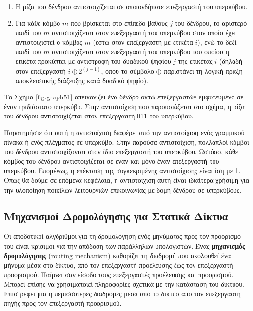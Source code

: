 \documentclass[12pt,a4paper]{article} %
\begin{document}
\begin{enumerate}
\item Η ρίζα του δένδρου αντιστοιχίζεται σε οποιονδήποτε επεξεργαστή
του υπερκύβου.

\item Για κάθε κόμβο $m$ που βρίσκεται στο επίπεδο βάθους $j$ του δένδρου, 
το αριστερό παιδί του $m$ αντιστοιχίζεται στον επεξεργαστή του υπερκύβου 
στον οποίο έχει αντιστοιχιστεί ο κόμβος $m$ (έστω στον επεξεργαστή με 
ετικέτα $i$), ενώ το δεξί παιδί του $m$ αντιστοιχίζεται στον επεξεργαστή 
του υπερκύβου του οποίου η ετικέτα προκύπτει με αντιστροφή του δυαδικού 
ψηφίου $j$ της ετικέτας $i$ (δηλαδή στον επεξεργαστή $i \oplus 2^{(j-1)}$,
όπου το σύμβολο $\oplus$ παριστάνει τη λογική πράξη
αποκλειστικής διάζευξης κατά δυαδικό ψηφίο).
\end{enumerate}

\noindent Το Σχήμα \ref{fig:graph51} απεικονίζει ένα δένδρο οκτώ 
επεξεργαστών εμφυτευμένο σε έναν τριδιάστατο υπερκύβο. Στην 
αντιστοίχιση που παρουσιάζεται στο σχήμα, η ρίζα του δένδρου
αντιστοιχίζεται στον επεξεργαστή 011 του υπερκύβου.

Παρατηρήστε ότι αυτή η αντιστοίχιση διαφέρει από την αντιστοίχιση
ενός γραμμικού πίνακα ή ενός πλέγματος σε υπερκύβο. Στην παρούσα 
αντιστοίχιση, πολλαπλοί κόμβοι του δένδρου αντιστοιχίζονται στον ίδιο 
επεξεργαστή του υπερκύβου. Ωστόσο, κάθε κόμβος του δένδρου αντιστοιχίζεται 
σε έναν και μόνο έναν επεξεργαστή του υπερκύβου. Επομένως, η επέκταση 
της συγκεκριμένης αντιστοίχισης είναι ίση με 1. Όπως θα δούμε σε επόμενα 
κεφάλαια, η αντιστοίχιση αυτή είναι ιδιαίτερα χρήσιμη για την υλοποίηση 
ποικίλων λειτουργιών επικοινωνίας με δομή δένδρου σε υπερκύβους.

\subsection{Μηχανισμοί Δρομολόγησης για Στατικά Δίκτυα}
Οι αποδοτικοί αλγόριθμοι για τη δρομολόγηση ενός μηνύματος προς τον
προορισμό του είναι κρίσιμοι για την απόδοση των παράλληλων υπολογιστών.
Ένας \textbf{μηχανισμός δρομολόγησης} (routing mechanism)
καθορίζει τη διαδρομή που ακολουθεί ένα μήνυμα μέσα στο δίκτυο, από τον 
επεξεργαστή προέλευσης έως τον επεξεργαστή προορισμού. Παίρνει σαν είσοδο
τους επεξεργαστές προέλευσης και προορισμού. Μπορεί επίσης να χρησιμοποιεί 
πληροφορίες σχετικά με την κατάσταση του δικτύου. Επιστρέφει μία ή 
περισσότερες διαδρομές μέσα από το δίκτυο από τον επεξεργαστή πηγής προς 
τον επεξεργαστή προορισμού.
\end{document}
